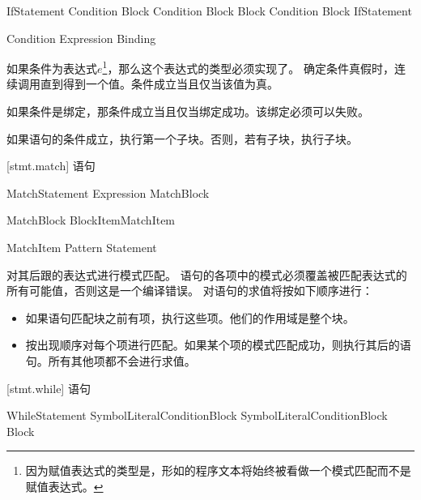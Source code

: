\begin{bnf}{IfStatement}
     Condition Block \br
     Condition Block  Block \br
     Condition Block  IfStatement
\end{bnf}

\begin{bnf}{Condition}
    Expression \br
    Binding
\end{bnf}

\pnum
如果条件为表达式$e$\footnote{因为赋值表达式的类型是，形如的程序文本将始终被看做一个模式匹配而不是赋值表达式。}，那么这个表达式的类型必须实现了。
确定条件真假时，连续调用直到得到一个值。条件成立当且仅当该值为真。

\pnum
如果条件是绑定，那条件成立当且仅当绑定成功。该绑定必须可以失败。

\pnum
如果语句的条件成立，执行第一个子块。否则，若有子块，执行子块。

[stmt.match]{ 语句}

\begin{bnf}{MatchStatement}
     Expression MatchBlock
\end{bnf}

\begin{bnf}{MatchBlock}
    \terminal{\{} BlockItem\bnfs MatchItem\bnfp \terminal{\}}
\end{bnf}

\begin{bnf}{MatchItem}
    Pattern \terminal{->} Statement
\end{bnf}

\pnum
{}对其后跟的表达式进行模式匹配。
语句的各项中的模式必须覆盖被匹配表达式的所有可能值，否则这是一个编译错误。
对语句的求值将按如下顺序进行：

\begin{itemize}
    \item 如果语句匹配块之前有项，执行这些项。他们的作用域是整个块。
    \item 按出现顺序对每个项进行匹配。如果某个项的模式匹配成功，则执行其后的语句。所有其他项都不会进行求值。
\end{itemize}

[stmt.while]{ 语句}

\begin{bnf}{WhileStatement}
     SymbolLiteral\bnfq Condition\bnfq Block \br
     SymbolLiteral\bnfq Condition\bnfq Block  Block
\end{bnf}

